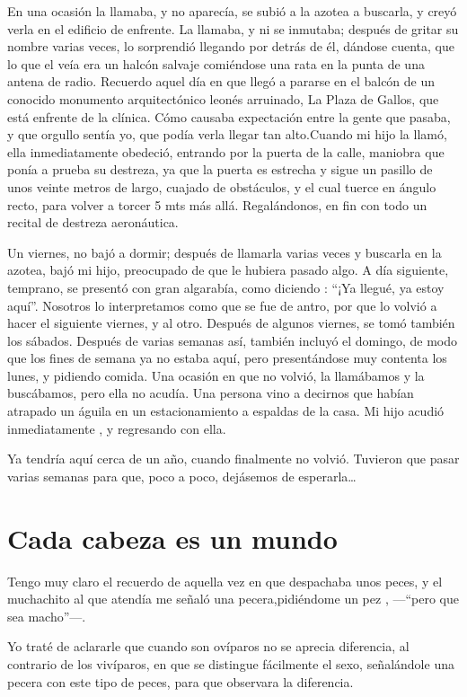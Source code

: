 \documentclass[letterpaper, 12pt]{book}
\begin{document}
En una ocasión la llamaba, y no aparecía, se subió a la azotea a buscarla, y creyó verla en el edificio de enfrente. La llamaba, y ni se inmutaba; después de gritar su nombre varias veces, lo sorprendió llegando por detrás de él, dándose cuenta, que lo que el veía era un halcón salvaje comiéndose una rata en la punta de una antena de radio. Recuerdo aquel día en que llegó a pararse en el balcón de un conocido monumento arquitectónico leonés arruinado, La Plaza de Gallos, que está enfrente de la clínica. Cómo causaba expectación entre la gente que pasaba, y que orgullo sentía yo, que podía verla llegar tan alto.Cuando mi hijo la llamó, ella inmediatamente obedeció, entrando por la puerta de la calle, maniobra que ponía a prueba su destreza, ya que la puerta es estrecha y sigue un pasillo de unos veinte metros de largo, cuajado de obstáculos, y el cual tuerce en ángulo recto, para volver a torcer 5 mts más allá. Regalándonos, en fin con todo un recital de destreza aeronáutica.


Un viernes, no bajó a dormir; después de llamarla varias veces y buscarla en la azotea, bajó mi hijo, preocupado de que le hubiera pasado algo. A día siguiente, temprano, se presentó con gran algarabía, como diciendo : ``¡Ya llegué, ya estoy aquí''. Nosotros lo interpretamos como que se fue de antro, por que lo volvió a hacer el siguiente viernes, y al otro. Después de algunos viernes, se tomó también los sábados. Después de varias semanas así, también incluyó el domingo, de modo que los fines de semana ya no estaba aquí, pero presentándose muy contenta los lunes, y pidiendo comida. Una ocasión en que no volvió, la llamábamos y  la buscábamos, pero ella no acudía. Una persona vino a decirnos que habían atrapado un águila en un estacionamiento a espaldas de la casa. Mi hijo acudió inmediatamente , y regresando con ella. 


Ya tendría aquí cerca de un año, cuando finalmente no volvió. Tuvieron que pasar varias semanas para que, poco a poco, dejásemos de esperarla\ldots


\chapter{Cada cabeza es un mundo}
Tengo muy claro el recuerdo de aquella vez en que despachaba unos peces, y el muchachito al que atendía me señaló una pecera,pidiéndome un pez , ---``pero que sea macho''---.

Yo traté de aclararle que cuando son ovíparos no se aprecia diferencia, al contrario de los vivíparos, en que se distingue fácilmente el sexo, señalándole una pecera con este tipo de peces, para que observara la diferencia.
\end{document}
